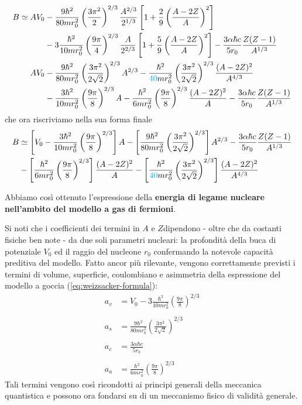\begin{align*}
	B \simeq A V_{0} &- \frac{9\hbar^{2}}{80 mr_{0}^{2}}\left( \frac{3\pi^{2}}{2} \right)^{2/3} \frac{A^{2/3}}{2^{1/3}}  \left[ 1+ \frac{2}{9} \left( \frac{A-2Z}{A} \right)^{2} \right] \\
	&- 3 \frac{\hbar^{2}}{10 m r_{0}^{2}} \left( \frac{9\pi}{4} \right)^{2/3} \frac{A}{2^{2/3}}  \left[ 1 + \frac{5}{9} \left( \frac{A-2Z}{A} \right)^{2} \right] - \frac{3 \alpha \hbar c}{5 r_{0}} \frac{Z(Z-1)}{A^{1/3}} \\
	AV_{0} &- \frac{9\hbar^{2}}{80mr_{0}^{2}} \left( \frac{3\pi^{2}}{2\sqrt{ 2 }} \right)^{2/3} A^{2/3} - \frac{\hbar^{2}}{\textcolor{cyan}{40} m r_{0}^{2}} \left( \frac{3\pi^{2}}{2\sqrt{ 2 }} \right)^{2/3} \frac{(A-2Z)^{2}}{A^{4/3}} \\
	&- \frac{3\hbar^{2}}{10mr_{0}^{2}} \left( \frac{9\pi}{8} \right)^{2/3}A - \frac{\hbar^{2}}{6mr_{0}^{2}} \left( \frac{9\pi}{8} \right)^{2/3} \frac{(A-2Z)^{2}}{A} - \frac{3 \alpha \hbar c}{5 r_{0}} \frac{Z(Z-1)}{A^{1/3}}
\end{align*}
che ora riscriviamo nella sua forma finale
\begin{align}
		B &\simeq \left[ V_{0} - \frac{3\hbar^{2}}{10mr_{0}^{2}} \left( \frac{9\pi}{8} \right)^{2/3} \right] A - \left[ \frac{9\hbar^{2}}{80mr_{0}^{2}} \left( \frac{3\pi^{2}}{2\sqrt{ 2 }} \right)^{2/3} \right]A^{2/3}
	- \frac{3 \alpha \hbar c}{5 r_{0}} \frac{Z(Z-1)}{A^{1/3}} \nonumber \\
	&- \left[ \frac{\hbar^{2}}{6mr_{0}^{2}} \left( \frac{9\pi}{8} \right)^{2/3}  \right]\frac{(A-2Z)^{2}}{A}
	- \left[ \frac{\hbar^{2}}{\textcolor{cyan}{40} m r_{0}^{2}} \left( \frac{3\pi^{2}}{2\sqrt{ 2 }} \right)^{2/3} \right] \frac{(A-2Z)^{2}}{A^{4/3}}
	\label{eq:binding-energy-expression-fermi-gas-model}
\end{align}


Abbiamo così ottenuto l’espressione della \textbf{energia di legame nucleare nell’ambito del modello a gas di fermioni}.

Si noti che i coefficienti dei termini in $A$ e $Z $dipendono - oltre che da costanti fisiche ben note - da due soli parametri nucleari:
la profondità della buca di potenziale $V_{0}$ ed il raggio del nucleone $r_{0}$ confermando la notevole capacità preditiva del modello. 
Fatto ancor più rilevante, vengono correttamente previsti i termini di volume, superficie, coulombiano e asimmetria della 
espressione del modello a goccia (\ref{eq:weizsacker-formula}):
\begin{align}
	a_{v} &= V_{0} - 3 \frac{\hbar^{2}}{10 m r_{0}^{2}} \left( \frac{9\pi}{8} \right)^{2/3} \\ \\
	a_{s} &= \frac{9\hbar^{2}}{80 m r_{0}^{2}} \left(  \frac{3\pi^{2}}{2\sqrt{ 2 }} \right)^{2/3} \\ \\
	a_{c} &= \frac{3 \alpha \hbar c}{5 r_{0}} \\ \\
	a_{a} &= \frac{\hbar^{2}}{6 m r_{0}^{2}} \left(\frac{9\pi}{8} \right)^{2/3}
\end{align}
Tali termini vengono così ricondotti ai principi generali della meccanica quantistica e possono ora fondarsi su di un meccanismo fisico di validità generale.

